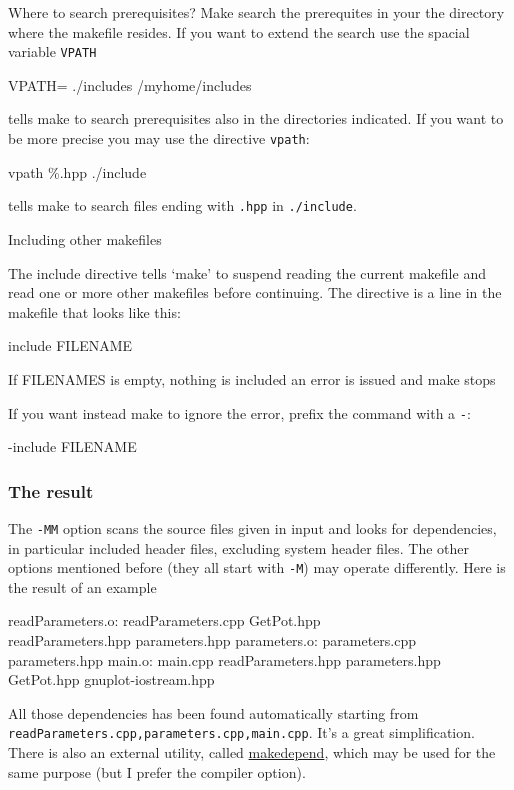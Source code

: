 \documentclass[10pt,aspectratio=169]{beamer}
\begin{document}
\begin{frame}{Where to search prerequisites?}
    Make search the prerequites in your the directory where the makefile resides.
    If you want to extend the search use the spacial variable \texttt{VPATH}
    
    \begin{semiverbatim}
        VPATH= ./includes /myhome/includes
    \end{semiverbatim}
    tells make to search prerequisites also in the directories indicated.
    If you want to be more precise you may use the directive \texttt{vpath}:
    \begin{semiverbatim}
        vpath \%.hpp ./include
    \end{semiverbatim}
    tells make to search files ending with \texttt{.hpp} in \texttt{./include}.
  \end{frame}

\begin{frame}{Including other makefiles} 
    
    The \alert{include} directive tells `make' to suspend reading the
    current makefile and read one or more other makefiles before
    continuing.  The directive is a line in the makefile that looks like
    this:
    
    \begin{semiverbatim}
        include FILENAME
    \end{semiverbatim}
    
    If FILENAMES is empty, nothing is included an error is issued and make stops
    
    If you want instead make to ignore the error, prefix the command with a
    \texttt{-}:
    \begin{semiverbatim}
        -include FILENAME
    \end{semiverbatim}
  \end{frame}


\begin{frame}[fragile]
    \frametitle{The result}
    The \texttt{-MM} option scans the source files given in input and looks for dependencies, in particular included header files, \alert{excluding system header files}.  The other options mentioned before (they all start with \texttt{-M}) may operate differently.
    Here is the result of an example
    \begin{semiverbatim}
        readParameters.o: readParameters.cpp GetPot.hpp \\
        readParameters.hpp parameters.hpp
        parameters.o: parameters.cpp parameters.hpp
        main.o: main.cpp readParameters.hpp parameters.hpp \\
        GetPot.hpp gnuplot-iostream.hpp
    \end{semiverbatim}
    All those dependencies has been found automatically starting from
    \texttt{readParameters.cpp,parameters.cpp,main.cpp}. It's a great
    simplification. There is also an external utility, called
    \href{https://linux.die.net/man/1/makedepend}{makedepend}, which may be used for the same purpose (but I
    prefer the compiler option).
\end{frame}
\end{document}

